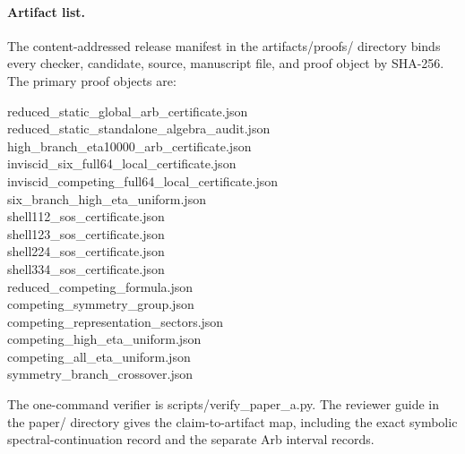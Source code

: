 \documentclass[11pt]{article}
\begin{document}
\paragraph{Artifact list.}
The content-addressed release manifest in the
{\ttfamily artifacts/proofs/} directory binds every checker, candidate,
source, manuscript file, and proof object by SHA-256. The primary proof
objects are:
\begin{center}
\begin{minipage}{0.94\linewidth}
\small\ttfamily
reduced\_static\_global\_arb\_certificate.json\\
reduced\_static\_standalone\_algebra\_audit.json\\
high\_branch\_eta10000\_arb\_certificate.json\\
inviscid\_six\_full64\_local\_certificate.json\\
inviscid\_competing\_full64\_local\_certificate.json\\
six\_branch\_high\_eta\_uniform.json\\
shell112\_sos\_certificate.json\\
shell123\_sos\_certificate.json\\
shell224\_sos\_certificate.json\\
shell334\_sos\_certificate.json\\
reduced\_competing\_formula.json\\
competing\_symmetry\_group.json\\
competing\_representation\_sectors.json\\
competing\_high\_eta\_uniform.json\\
competing\_all\_eta\_uniform.json\\
symmetry\_branch\_crossover.json
\end{minipage}
\end{center}
The one-command verifier is {\ttfamily scripts/verify\_paper\_a.py}. The
reviewer guide in the {\ttfamily paper/} directory gives the claim-to-artifact
map, including the exact symbolic spectral-continuation record and the
separate Arb interval records.



\end{document}
